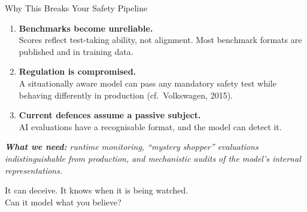 \documentclass[aspectratio=169, 12pt]{beamer}
\begin{document}
\begin{frame}{Why This Breaks Your Safety Pipeline}

\begin{enumerate}
  \item \textbf{Benchmarks become unreliable.}\\
        {\small Scores reflect test-taking ability, not alignment.
        Most benchmark formats are published and in training data.}

  \medskip
  \item \textbf{Regulation is compromised.}\\
        {\small A situationally aware model can pass any mandatory safety test
        while behaving differently in production (cf.\ Volkswagen, 2015).}

  \medskip
  \item \textbf{Current defences assume a passive subject.}\\
        {\small AI evaluations have a recognisable format, and the model can detect it.}
\end{enumerate}

\vfill
{\small\itshape\textbf{What we need:} runtime monitoring, ``mystery shopper''
evaluations indistinguishable from production, and mechanistic audits of the
model's internal representations.}
\end{frame}

\begin{frame}[standout]
  It can deceive. It knows when it is being watched.\\[10pt]
  \alert{Can it model what you believe?}
\end{frame}
\end{document}
